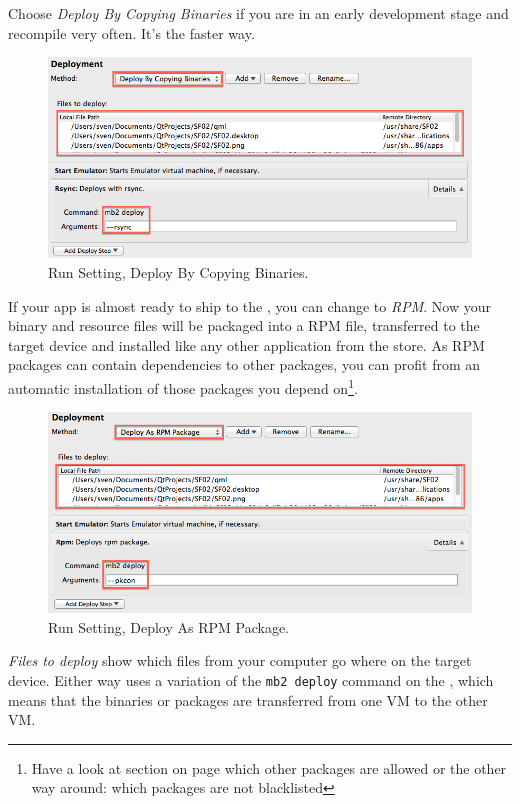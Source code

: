 Choose \emph{Deploy By Copying Binaries} if you are in an early development stage and recompile very often. It's the faster way.
%
\begin{figure}[H]
  \centering
  \includegraphics[scale=0.5]{../media/gfx/QtCreator/RunSettingsCopyBinary.png} 
  \caption{Run Setting, Deploy By Copying Binaries.}
  \label{fig:RunSettingsCopyBinary}
\end{figure}
%
If your app is almost ready to ship to the , you can change to \emph{RPM}. Now your binary and resource files will be packaged into a RPM file, transferred to the target device and installed like any other application from the store. As RPM packages can contain dependencies to other packages, you can profit from an automatic installation of those packages you depend on\footnote{Have a look at section  on page \pageref{sec:harbour} which other packages are allowed or the other way around: which packages are not blacklisted}.
%
\begin{figure}[H]
  \centering
  \includegraphics[scale=0.5]{../media/gfx/QtCreator/RunSettingsRpm.png} 
  \caption{Run Setting, Deploy As RPM Package.}
  \label{fig:RunSettingsRpm}
\end{figure}
%
\emph{Files to deploy} show which files from your computer go where on the target device.
Either way uses a variation of the \verb,mb2 deploy, command on the , which means that the binaries or packages are transferred from one VM to the other VM.

